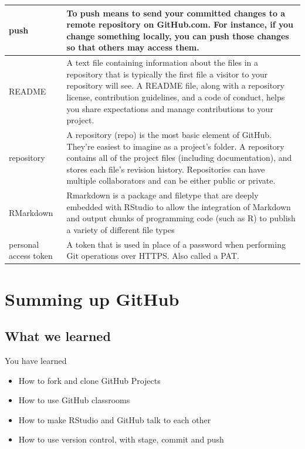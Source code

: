 \documentclass[
]{book}
\begin{document}
\begin{tabular}[t]{l|l}
\hline
push & To push means to send your committed changes to a remote repository on GitHub.com. For instance, if you change something locally, you can push those changes so that others may access them.\\
\hline
README & A text file containing information about the files in a repository that is typically the first file a visitor to your repository will see. A README file, along with a repository license, contribution guidelines, and a code of conduct, helps you share expectations and manage contributions to your project.\\
\hline
repository & A repository (repo) is the most basic element of GitHub. They're easiest to imagine as a project's folder. A repository contains all of the project files (including documentation), and stores each file's revision history. Repositories can have multiple collaborators and can be either public or private.\\
\hline
RMarkdown & Rmarkdown is a package and filetype that are deeply embedded with RStudio to allow the integration of Markdown and output chunks of programming code (such as R) to publish a variety of different file types\\
\hline
personal access token & A token that is used in place of a password when performing Git operations over HTTPS. Also called a PAT.\\
\hline
\end{tabular}

\hypertarget{summing-up-github}{%
\section{Summing up GitHub}\label{summing-up-github}}

\hypertarget{what-we-learned-3}{%
\subsection{What we learned}\label{what-we-learned-3}}

You have learned

\begin{itemize}
\item
  How to fork and clone GitHub Projects
\item
  How to use GitHub classrooms
\item
  How to make RStudio and GitHub talk to each other
\item
  How to use version control, with stage, commit and push
\end{itemize}
\end{document}
